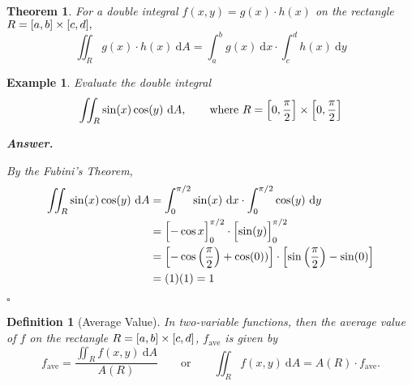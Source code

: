 \documentclass[12pt,a4paper]{article}
\newtheorem{thm}{Theorem}[subsection]
\newtheorem{df}{Definition}[subsection]
\newtheorem{eg}{Example}[subsection]
\newenvironment*{ans}{\par\indent\textbf{\textit{Answer. }}\par}{\par\hfill{$\square$}\par}
\def\dsst{\displaystyle}
\def\d{{\mathrm{d}}}
\def\dx{\d x}
\def\iintR{\dsst\iint_R}
\begin{document}
\begin{thm}
	For a double integral $f(x,y)=g(x)\cdot h(x)$ on the rectangle $R=\qty[a,b]\times\qty[c,d],$ \[\iint_R g(x)\cdot h(x)\ \d A=\int_a^b g(x)\ \dx\cdot\int_c^d h(x)\ \d y\]
\end{thm}
\begin{eg}
	Evaluate the double integral \[\iintR\sin(x)\cos(y)\ \d A,\qquad\text{where }R=\qty[0,\dfrac{\pi}{2}]\times\qty[0,\dfrac{\pi}{2}]\]	
	\begin{ans}
		By the Fubini's Theorem, \[\begin{aligned}\iintR\sin(x)\cos(y)\ \d A&=\int_0^{\pi/2}\sin(x)\ \dx\cdot\int_0^{\pi/2}\cos(y)\ \d y\\&=\qty\Big[-\cos{x}]_0^{\pi/2}\cdot\qty\Big[\sin(y)]_0^{\pi/2}\\&=\qty[-\cos\qty(\dfrac{\pi}{2})+\cos(0))]\cdot\qty[\sin\qty(\dfrac{\pi}{2})-\sin(0)]\\&=(1)(1)=1\end{aligned}\]
	\end{ans}
\end{eg}
\begin{df}[Average Value]
	In two-variable functions, then the average value of $f$ on the rectangle $R=\qty[a,b]\times[c,d]$, $f_\text{ave}$ is given by \[f_\text{ave}=\dfrac{\iintR f(x,y)\ \d A}{A(R)}\qquad\text{or}\qquad\iintR f(x,y)\ \d A=A(R)\cdot f_\text{ave}.\]	
\end{df}
\end{document}
